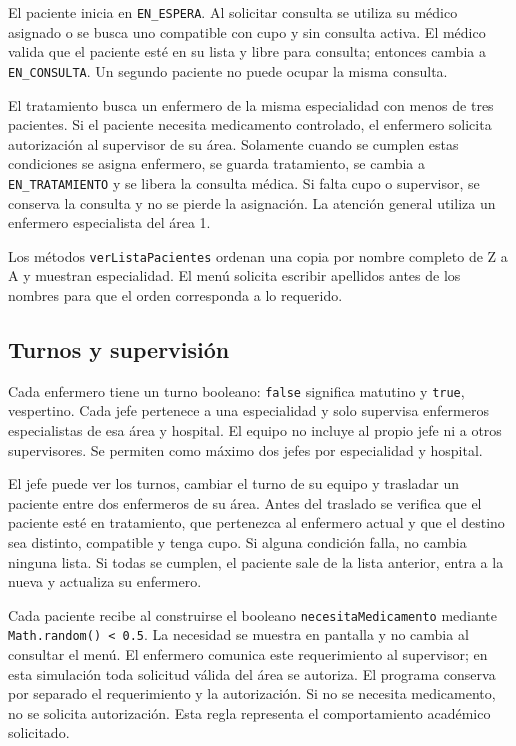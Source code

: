 \documentclass[letterpaper,12pt,oneside]{article}
\begin{document}
El paciente inicia en \texttt{EN\_ESPERA}. Al solicitar consulta se utiliza su médico asignado o se busca uno compatible con cupo y sin consulta activa. El médico valida que el paciente esté en su lista y libre para consulta; entonces cambia a \texttt{EN\_CONSULTA}. Un segundo paciente no puede ocupar la misma consulta.

El tratamiento busca un enfermero de la misma especialidad con menos de tres pacientes. Si el paciente necesita medicamento controlado, el enfermero solicita autorización al supervisor de su área. Solamente cuando se cumplen estas condiciones se asigna enfermero, se guarda tratamiento, se cambia a \texttt{EN\_TRATAMIENTO} y se libera la consulta médica. Si falta cupo o supervisor, se conserva la consulta y no se pierde la asignación. La atención general utiliza un enfermero especialista del área 1.

Los métodos \texttt{verListaPacientes} ordenan una copia por nombre completo de Z a A y muestran especialidad. El menú solicita escribir apellidos antes de los nombres para que el orden corresponda a lo requerido.

\subsection{Turnos y supervisión}
Cada enfermero tiene un turno booleano: \texttt{false} significa matutino y \texttt{true}, vespertino. Cada jefe pertenece a una especialidad y solo supervisa enfermeros especialistas de esa área y hospital. El equipo no incluye al propio jefe ni a otros supervisores. Se permiten como máximo dos jefes por especialidad y hospital.

El jefe puede ver los turnos, cambiar el turno de su equipo y trasladar un paciente entre dos enfermeros de su área. Antes del traslado se verifica que el paciente esté en tratamiento, que pertenezca al enfermero actual y que el destino sea distinto, compatible y tenga cupo. Si alguna condición falla, no cambia ninguna lista. Si todas se cumplen, el paciente sale de la lista anterior, entra a la nueva y actualiza su enfermero.

Cada paciente recibe al construirse el booleano \texttt{necesitaMedicamento} mediante \texttt{Math.random() < 0.5}. La necesidad se muestra en pantalla y no cambia al consultar el menú. El enfermero comunica este requerimiento al supervisor; en esta simulación toda solicitud válida del área se autoriza. El programa conserva por separado el requerimiento y la autorización. Si no se necesita medicamento, no se solicita autorización. Esta regla representa el comportamiento académico solicitado.
\end{document}
